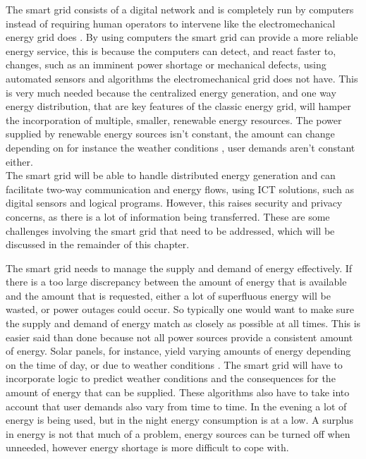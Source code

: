 The smart grid consists of a digital network and is completely run by computers instead of  requiring human operators to intervene like the electromechanical energy grid does \cite{Moslehi2010}. By using computers the smart grid can provide a more reliable energy service, this is because the computers can detect, and react faster to, changes, such as an imminent power shortage or mechanical defects, using automated sensors and algorithms the electromechanical grid does not have. This is very much needed because the centralized energy generation, and one way energy distribution, that are key features of the classic energy grid, will hamper the incorporation of multiple, smaller, renewable energy resources. The power supplied by renewable energy sources isn't constant, the amount can change depending on for instance the weather conditions \cite{RamchurnVitelingumRogersJennings2014}, user demands aren't constant either. \\
The smart grid will be able to handle distributed energy generation and can facilitate two-way communication and energy flows, using ICT solutions, such as digital sensors and logical programs. However, this raises security and privacy concerns, as there is a lot of information being transferred. These are some challenges involving the smart grid that need to be addressed, which will be discussed in the remainder of this chapter.


The smart grid needs to manage the supply and demand of energy effectively. If there is a too large discrepancy between the amount of energy that is available and the amount that is requested, either a lot of superfluous energy will be wasted, or power outages could occur. 
So typically one would want to make sure the supply and demand of energy match as closely as possible at all times. This is easier said than done because not all power sources provide a consistent amount of energy. Solar panels, for instance, yield varying amounts of energy depending on the time of day, or due to weather conditions \cite{RamchurnVitelingumRogersJennings2014}. The smart grid will have to incorporate logic to predict weather conditions and the consequences for the amount of energy that can be supplied. These algorithms also have to take into account that user demands also vary from time to time. In the evening a lot of energy is being used, but in the night energy consumption is at a low. A surplus in energy is not that much of a problem, energy sources can be turned off when unneeded, however energy shortage is more difficult to cope with.

